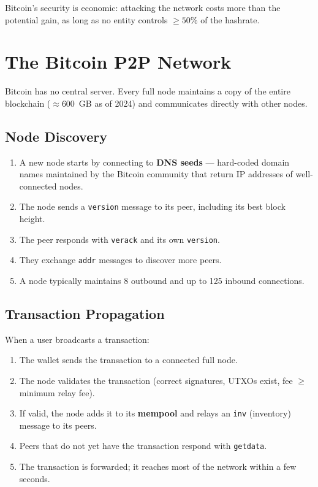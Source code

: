 \documentclass[12pt,a4paper,openany]{book}
\theoremstyle{definition}
\theoremstyle{plain}
\theoremstyle{remark}
\begin{document}
\begin{keyinsight}
  Bitcoin's security is economic: attacking the network costs more than
  the potential gain, as long as no entity controls $\geq 50\%$ of the
  hashrate.
\end{keyinsight}

\section{The Bitcoin P2P Network}

Bitcoin has no central server.  Every full node maintains a copy of the
entire blockchain ($\approx 600$~GB as of 2024) and communicates
directly with other nodes.

\subsection{Node Discovery}

\begin{enumerate}
  \item A new node starts by connecting to \textbf{DNS seeds} —
        hard-coded domain names maintained by the Bitcoin community that
        return IP addresses of well-connected nodes.
  \item The node sends a \texttt{version} message to its peer, including
        its best block height.
  \item The peer responds with \texttt{verack} and its own
        \texttt{version}.
  \item They exchange \texttt{addr} messages to discover more peers.
  \item A node typically maintains 8 outbound and up to 125 inbound
        connections.
\end{enumerate}

\subsection{Transaction Propagation}

When a user broadcasts a transaction:
\begin{enumerate}
  \item The wallet sends the transaction to a connected full node.
  \item The node validates the transaction (correct signatures, UTXOs
        exist, fee $\geq$ minimum relay fee).
  \item If valid, the node adds it to its \textbf{mempool} and relays
        an \texttt{inv} (inventory) message to its peers.
  \item Peers that do not yet have the transaction respond with
        \texttt{getdata}.
  \item The transaction is forwarded; it reaches most of the network
        within a few seconds.
\end{enumerate}
\end{document}
